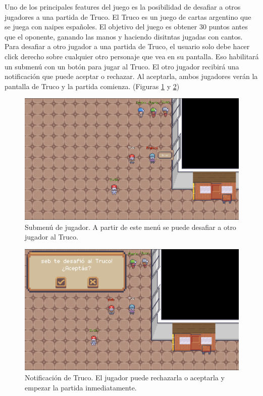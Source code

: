 Uno de los principales features del juego es la posibilidad de desafiar a otros jugadores a una partida de 
Truco. El Truco es un juego de cartas argentino que se juega con naipes españoles. El objetivo del juego
es obtener 30 puntos antes que el oponente, ganando las manos y haciendo disitntas jugadas con cantos.
Para desafiar a otro jugador a una partida de Truco, el usuario solo debe hacer click derecho sobre cualquier
otro personaje que vea en su pantalla. Eso habilitará un submenú con un botón para jugar al Truco.
El otro jugador recibirá una notificación que puede aceptar o rechazar. Al aceptarla, ambos jugadores
verán la pantalla de Truco y la partida comienza. (Figuras \ref{fig:truco-submenu} y \ref{fig:truco-notification})

\begin{figure}[htbp]
    \centering
    \includegraphics[width=1.0\textwidth]{../assets/godot-truco-menu.png}
    \caption{Submenú de jugador. A partir de este menú se puede desafiar a otro jugador al Truco.}
    \label{fig:truco-submenu}
\end{figure}

\begin{figure}[htbp]
    \centering
    \includegraphics[width=1.0\textwidth]{../assets/godot-truco-notification.png}
    \caption{Notificación de Truco. El jugador puede rechazarla o aceptarla y empezar la partida inmediatamente.}
    \label{fig:truco-notification}
\end{figure}

